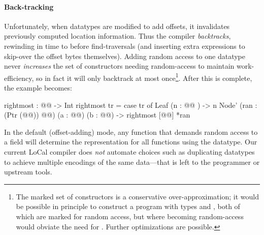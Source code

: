 
\paragraph{Back-tracking}
%
Unfortunately, when datatypes are modified to add offsets, it invalidates
previously computed location information.  Thus the compiler {\em backtracks},
rewinding in time to before find-traversals (and inserting extra 
expressions to skip-over the offset bytes themselves).
%
Adding random access to one datatype never \emph{increases} the set of
constructors needing random-access to maintain work-efficiency, so in fact it will
only backtrack at most once\footnote{The marked set of constructors
  is a conservative over-approximation; it would be possible in principle to
  construct a program with types  and , both of which are marked for
  random access, but where  becoming random-access would obviate the need
  for .  Further optimizations are possible.}.
%
%
After this is complete, the  example becomes:
%
\begin{code}
rightmost : @@ -> Int
rightmost tr =
 case tr of
   Leaf (n : @@ ) -> n
   Node' (ran : (Ptr (@@)) @@)
         (a : @@) (b : @@)
      -> rightmost [@@] *ran
\end{code}


%
In the default (offset-adding) mode, any function that demands random access to
a field will determine the representation for all functions using the
datatype.
%
Our current LoCal compiler does \emph{not} automate choices such as duplicating
datatypes to achieve multiple encodings of the same data---that is left to the
programmer or upstream tools.

